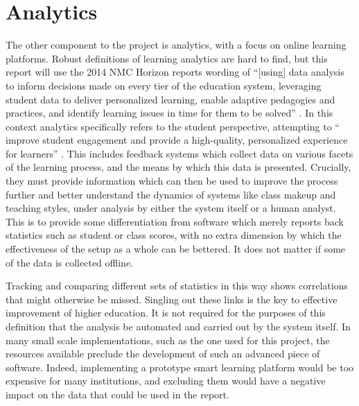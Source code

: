 \documentclass[12pt,a4paper,twoside]{report}
\begin{document}
\section{Analytics}
The other component to the project is analytics, with a focus on online learning platforms. Robust definitions of learning analytics are hard to find, but this report will use the 2014 NMC Horizon reports wording of ``[using] data analysis to inform decisions made on every tier of the education system, leveraging student data to deliver personalized learning, enable adaptive pedagogies and practices, and identify learning issues in time for them to be solved'' \cite{johnson2014nmc}. In this context analytics specifically refers to the student perspective, attempting to `` improve student engagement and provide a high-quality, personalized experience for learners'' \cite{johnson2014nmc}. This includes feedback systems which collect data on various facets of the learning process, and the means by which this data is presented. Crucially, they must provide information which can then be used to improve the process further and better understand the dynamics of systems like class makeup and teaching styles, under analysis by either the system itself or a human analyst. This is to provide some differentiation from software which merely reports back statistics such as student or class scores, with no extra dimension by which the effectiveness of the setup as a whole can be bettered. It does not matter if some of the data is collected offline.

Tracking and comparing different sets of statistics in this way shows correlations that might otherwise be missed. Singling out these links is the key to effective improvement of higher education. It is not required for the purposes of this definition that the analysis be automated and carried out by the system itself. In many small scale implementations, such as the one used for this project, the resources available preclude the development of such an advanced piece of software. Indeed, implementing a prototype smart learning platform would be too expensive for many institutions, and excluding them would have a negative impact on the data that could be used in the report.
\end{document}
